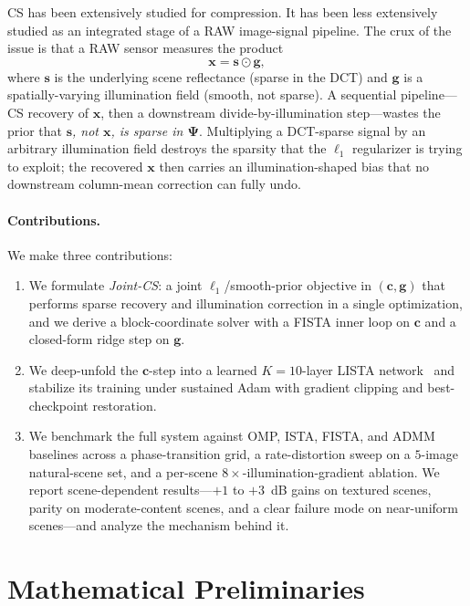 \documentclass{article}
\begin{document}
CS has been extensively studied for compression. It has been less extensively studied as an integrated stage of a RAW image-signal pipeline. The crux of the issue is that a RAW sensor measures the product
\begin{equation}
  \boldsymbol{x} = \boldsymbol{s} \odot \boldsymbol{g},
  \label{eq:image-formation}
\end{equation}
where $\boldsymbol{s}$ is the underlying scene reflectance (sparse in the DCT) and $\boldsymbol{g}$ is a spatially-varying illumination field (smooth, not sparse). A sequential pipeline---CS recovery of $\boldsymbol{x}$, then a downstream divide-by-illumination step---wastes the prior that \emph{$\boldsymbol{s}$, not $\boldsymbol{x}$, is sparse in $\boldsymbol{\Psi}$}. Multiplying a DCT-sparse signal by an arbitrary illumination field destroys the sparsity that the $\ell_1$ regularizer is trying to exploit; the recovered $\boldsymbol{x}$ then carries an illumination-shaped bias that no downstream column-mean correction can fully undo.

\paragraph{Contributions.} We make three contributions:
\begin{enumerate}[topsep=0pt,itemsep=0pt]
\item We formulate \emph{Joint-CS}: a joint $\ell_1$/smooth-prior objective in $(\boldsymbol{c}, \boldsymbol{g})$ that performs sparse recovery and illumination correction in a single optimization, and we derive a block-coordinate solver with a FISTA inner loop on $\boldsymbol{c}$ and a closed-form ridge step on $\boldsymbol{g}$.
\item We deep-unfold the $\boldsymbol{c}$-step into a learned $K{=}10$-layer LISTA network~\citep{gregor2010lista} and stabilize its training under sustained Adam with gradient clipping and best-checkpoint restoration.
\item We benchmark the full system against OMP, ISTA, FISTA, and ADMM baselines across a phase-transition grid, a rate-distortion sweep on a $5$-image natural-scene set, and a per-scene $8\times$-illumination-gradient ablation. We report scene-dependent results---$+1$ to $+3$~dB gains on textured scenes, parity on moderate-content scenes, and a clear failure mode on near-uniform scenes---and analyze the mechanism behind it.
\end{enumerate}

\section{Mathematical Preliminaries}
\label{sec:prelim}
\end{document}
